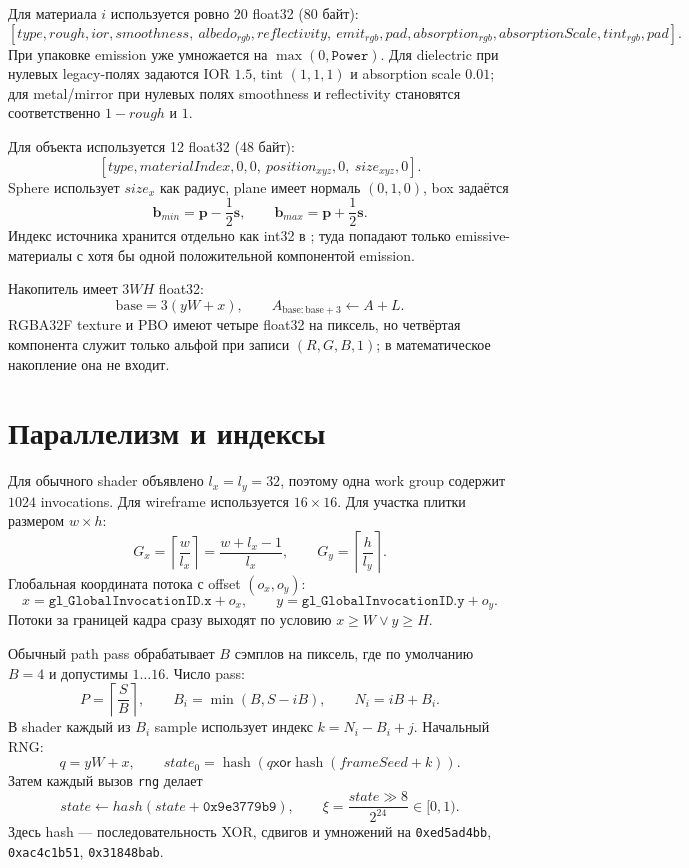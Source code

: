 \documentclass[11pt,a4paper]{article}
\newcommand{\code}[1]{\path{#1}}
\newcommand{\vect}[1]{\boldsymbol{#1}}
\begin{document}
Для материала $i$ используется ровно 20 float32 (80 байт):
\[
 [type,rough,ior,smoothness,\ albedo_{rgb},reflectivity,\ emit_{rgb},pad,
 absorption_{rgb},absorptionScale,tint_{rgb},pad].
\]
При упаковке emission уже умножается на $\max(0,\texttt{Power})$. Для dielectric
при нулевых legacy-полях задаются IOR $1.5$, tint $(1,1,1)$ и absorption scale
$0.01$; для metal/mirror при нулевых полях smoothness и reflectivity становятся
соответственно $1-rough$ и $1$.

Для объекта используется 12 float32 (48 байт):
\[
 [type,materialIndex,0,0,\ position_{xyz},0,\ size_{xyz},0].
\]
Sphere использует $size_x$ как радиус, plane имеет нормаль $(0,1,0)$, box задаётся
\[
 \vect b_{min}=\vect p-\frac12\vect s,\qquad
 \vect b_{max}=\vect p+\frac12\vect s.
\]
Индекс источника хранится отдельно как int32 в \code{lightIndices}; туда попадают
только emissive-материалы с хотя бы одной положительной компонентой emission.

Накопитель имеет $3WH$ float32:
\[
 \mathrm{base}=3(yW+x),\qquad
 A_{\mathrm{base}:\mathrm{base}+3}\leftarrow A+L.
\]
RGBA32F texture и PBO имеют четыре float32 на пиксель, но четвёртая компонента
служит только альфой при записи $(R,G,B,1)$; в математическое накопление она не
входит.

\section{Параллелизм и индексы}

Для обычного shader объявлено $l_x=l_y=32$, поэтому одна work group содержит
$1024$ invocations. Для wireframe используется $16\times16$. Для участка плитки
размером $w\times h$:
\[
 G_x=\left\lceil\frac{w}{l_x}\right\rceil=\frac{w+l_x-1}{l_x},\qquad
 G_y=\left\lceil\frac{h}{l_y}\right\rceil.
\]
Глобальная координата потока с offset $(o_x,o_y)$:
\[
 x=\texttt{gl\_GlobalInvocationID.x}+o_x,\qquad
 y=\texttt{gl\_GlobalInvocationID.y}+o_y.
\]
Потоки за границей кадра сразу выходят по условию $x\ge W\lor y\ge H$.

Обычный path pass обрабатывает $B$ сэмплов на пиксель, где по умолчанию $B=4$ и
допустимы $1\ldots16$. Число pass:
\[
 P=\left\lceil\frac{S}{B}\right\rceil,
 \qquad B_i=\min(B,S-iB),
 \qquad N_i=iB+B_i.
\]
В shader каждый из $B_i$ sample использует индекс $k=N_i-B_i+j$. Начальный RNG:
\[
 q=yW+x,\qquad state_0=\operatorname{hash}(q\mathbin{\mathsf{xor}}
 \operatorname{hash}(frameSeed+k)).
\]
Затем каждый вызов \texttt{rng} делает
\[
 state\leftarrow hash(state+\texttt{0x9e3779b9}),\qquad
 \xi=\frac{state\mathbin{\gg}8}{2^{24}}\in[0,1).
\]
Здесь hash --- последовательность XOR, сдвигов и умножений на
\texttt{0xed5ad4bb}, \texttt{0xac4c1b51}, \texttt{0x31848bab}.
\end{document}
